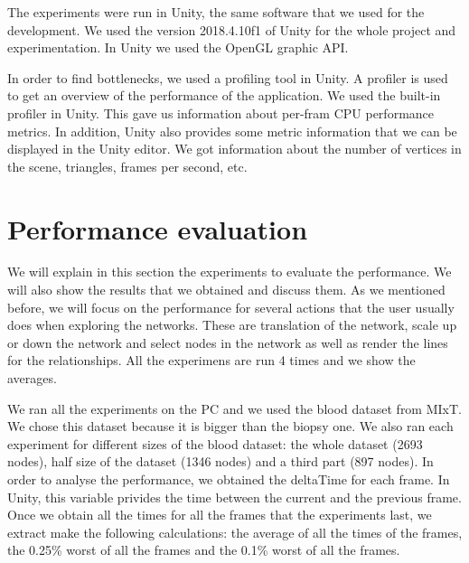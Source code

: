 The experiments were run in Unity, the same software that we used for the development. We used the version 2018.4.10f1 of Unity for the whole project and experimentation. In Unity we used the OpenGL graphic API.

In order to find bottlenecks, we used a profiling tool in Unity. A profiler is used to get an overview of the performance of the application. We used the built-in profiler in Unity. This gave us information about per-fram CPU  performance metrics. In addition, Unity also provides some metric information that we can be displayed in the Unity editor. We got information about the number of vertices in the scene, triangles, frames per second, etc.

\section{Performance evaluation}
We will explain in this section the experiments to evaluate the performance. We will also show the results that we obtained and discuss them. As we mentioned before, we will focus on the performance for several actions that the user usually does when exploring the networks. These are translation of the network, scale up or down the network and select nodes in the network as well as render the lines for the relationships. All the experimens are run 4 times and we show the averages.

We ran all the experiments on the PC and we used the blood dataset from MIxT. We chose this dataset because it is bigger than the biopsy one. We also ran each experiment for different sizes of the blood dataset: the whole dataset (2693 nodes), half size of the dataset (1346 nodes) and a third part (897 nodes). In order to analyse the performance, we obtained the deltaTime for each frame. In Unity, this variable privides the time between the current and the previous frame. Once we obtain all the times for all the frames that the experiments last, we extract make the following calculations: the average of all the times of the frames, the 0.25\% worst of all the frames and the 0.1\% worst of all the frames.


